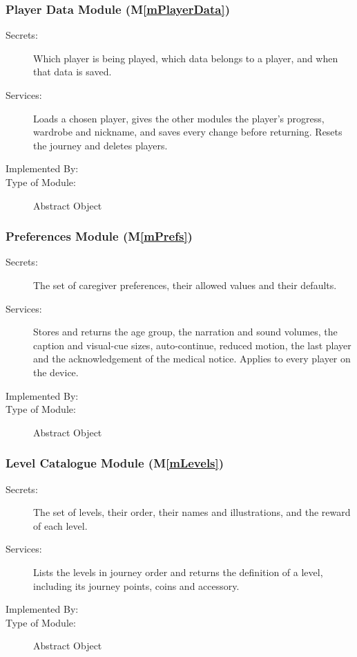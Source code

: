 \documentclass[10pt, titlepage]{article}
\newcommand{\mplainref}[1]{M\ref*{#1}}
\begin{document}
\subsubsection{Player Data Module (\mplainref{mPlayerData})}\label{md:mPlayerData}

\begin{description}
\item[Secrets:] Which player is being played, which data belongs to a player,
  and when that data is saved.
\item[Services:] Loads a chosen player, gives the other modules the player's
  progress, wardrobe and nickname, and saves every change before returning.
  Resets the journey and deletes players.
\item[Implemented By:] \progname{}
\item[Type of Module:] Abstract Object
\end{description}

\subsubsection{Preferences Module (\mplainref{mPrefs})}\label{md:mPrefs}

\begin{description}
\item[Secrets:] The set of caregiver preferences, their allowed values and
  their defaults.
\item[Services:] Stores and returns the age group, the narration and sound
  volumes, the caption and visual-cue sizes, auto-continue, reduced motion, the
  last player and the acknowledgement of the medical notice. Applies to every
  player on the device.
\item[Implemented By:] \progname{}
\item[Type of Module:] Abstract Object
\end{description}

\subsubsection{Level Catalogue Module (\mplainref{mLevels})}\label{md:mLevels}

\begin{description}
\item[Secrets:] The set of levels, their order, their names and illustrations,
  and the reward of each level.
\item[Services:] Lists the levels in journey order and returns the definition
  of a level, including its journey points, coins and accessory.
\item[Implemented By:] \progname{}
\item[Type of Module:] Abstract Object
\end{description}
\end{document}
